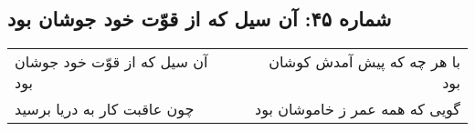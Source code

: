 \begin{center}
\section*{شماره ۴۵: آن سیل که از قوّت خود جوشان بود}
\label{sec:045}
\begin{longtable}{l p{0.5cm} r}
آن سیل که از قوّت خود جوشان بود
&&
با هر چه که پیش آمدش کوشان بود
\\
چون عاقبت کار به دریا برسید
&&
گویی که همه عمر ز خاموشان بود
\\
\end{longtable}
\end{center}

